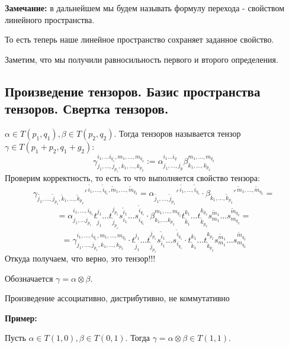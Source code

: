 \textbf{Замечание:} в дальнейшем мы будем называть формулу перехода - свойством линейного пространства.

То есть теперь наше линейное пространство сохраняет заданное свойство.


Заметим, что мы получили равносильность первого и второго определения.

\newpage
\subsection{Произведение тензоров. Базис пространства тензоров. Свертка тензоров.}

 $\alpha \in T(p_1,q_1),\beta \in T(p_2,q_2)$. Тогда  тензоров называется тензор $\gamma \in T(p_1+p_2,q_1+g_2):$
$$\gamma^{i_1,\ldots i_{q_1},m_1,\ldots,m_{q_2}}_{j_1,\ldots,j_{p_1},k_1,\ldots, k_{p_2}}:= \alpha^{i_1\ldots i_q}_{j_1,\ldots,j_p} \beta^{m_1,\ldots,m_{q_2}}_{k_1,\ldots, k_{p_2}}$$
Проверим корректность, то есть то что выполняется свойство тензора:
$$\gamma_{\widetilde{j_1},\ldots,\widetilde{j}_{p_1}, \widetilde{k}_1,\ldots, \widetilde{k}_{p_2}}'^{\, \widetilde{i_1},\ldots,\widetilde{i}_{q_1}, \widetilde{m}_1,\ldots, \widetilde{m}_{q_2}} = \alpha_{\widetilde{j_1},\ldots,\widetilde{j}_{p_1}}'^{\, \widetilde{i_1},\ldots,\widetilde{i}_{q_1}} \cdot \beta_{ \widetilde{k}_1,\ldots, \widetilde{k}_{p_2}}'^{\,\widetilde{m}_1,\ldots, \widetilde{m}_{q_2}} = $$
$$= \alpha_{j_1,\ldots j_{p_1}}^{i_1,\ldots, i_{q_1}} t_{\widetilde{j}_1}^{j_1}\ldots t_{\widetilde{j}_{p_1}}^{j_{p_1}} s_{i_1}^{\widetilde{i}_1}\ldots s_{i_{q_1}}^{\widetilde{i}_{q_1}}\cdot \beta_{k_1,\ldots k_{p_2}}^{m_1,\ldots, m_{q_2}} t_{\widetilde{k}_1}^{k_1}\ldots t_{\widetilde{k}_{p_2}}^{k_{p_2}} s_{m_1}^{\widetilde{m}_1}\ldots s_{m_{q_2}}^{\widetilde{m}_{q_2}} = $$
$$=\gamma_{j_1,\ldots,j_{p_1},k_1,\ldots , k_{p_2}}^{i_1,\ldots, i_{q_1}, m_1,\ldots,m_{q_2}}\cdot t_{\widetilde{j}_1}^{j_1}\ldots t_{\widetilde{j}_{p_1}}^{j_{p_1}} s_{i_1}^{\widetilde{i}_1}\ldots s_{i_{q_1}}^{\widetilde{i}_{q_1}}\cdot t_{\widetilde{k}_1}^{k_1}\ldots t_{\widetilde{k}_{p_2}}^{k_{p_2}} s_{m_1}^{\widetilde{m}_1}\ldots s_{m_{q_2}}^{\widetilde{m}_{q_2}}$$
Откуда получаем, что верно, это тензор!!!

Обозначается $\gamma = \alpha \otimes \beta$.

Произведение ассоциативно, дистрибутивно, не коммутативно



\textbf{Пример:}

Пусть $\alpha \in T(1,0), \beta \in T(0,1)$. Тогда $\gamma = \alpha \otimes \beta  \in T(1,1)$.

